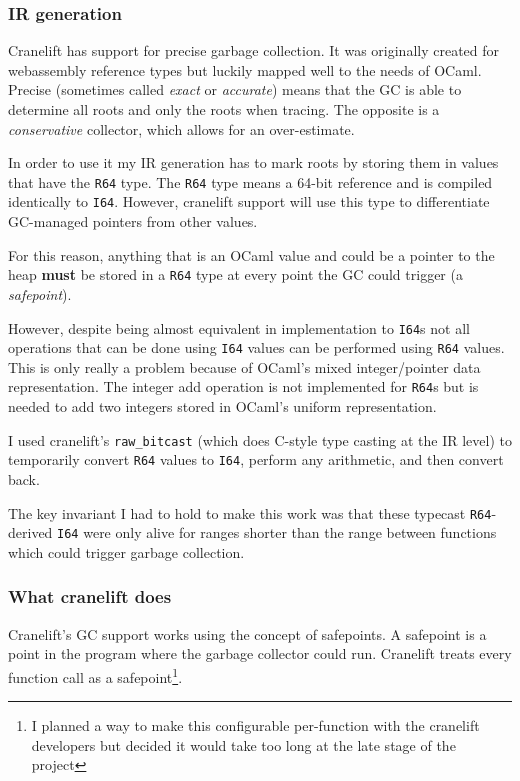 \subsubsection{IR generation} \label{gc-ir}

Cranelift has support for precise garbage collection. It was originally created for webassembly
reference types but luckily mapped well to the needs of OCaml. Precise (sometimes called
\emph{exact} or \emph{accurate}) means that the GC is able to determine all roots and only the
roots
when tracing. The opposite is a \emph{conservative} collector, which allows for an over-estimate.

In order to use it my IR generation has to mark roots by storing them in values that have the
\texttt{R64} type. The \texttt{R64} type means a 64-bit reference and is compiled identically to
\texttt{I64}. However, cranelift support will use this type to differentiate GC-managed pointers
from other values.

For this reason, anything that is an OCaml value and could be a pointer to the heap \textbf{must}
be stored in a \texttt{R64} type at every point the GC could trigger (a \emph{safepoint}).

However, despite being almost equivalent in implementation to \texttt{I64}s not all operations that
can be done using \texttt{I64} values can be performed using \texttt{R64} values. This is only
really a
problem because of OCaml's mixed integer/pointer data representation. The integer add operation is
not
implemented for \texttt{R64}s but is needed to add two integers stored in OCaml's uniform
representation.

I used cranelift's \texttt{raw\_bitcast} (which does C-style type casting at the IR level) to
temporarily convert \texttt{R64} values to \texttt{I64}, perform any arithmetic, and then convert
back.

The key invariant I had to hold to make this work was that these typecast \texttt{R64}-derived
\texttt{I64} were only alive for ranges shorter than the range between functions which could
trigger
garbage collection.

\subsubsection{What cranelift does}

Cranelift's GC support works using the concept of safepoints. A safepoint is a point in the program
where the garbage collector could run. Cranelift treats every function call as a
safepoint\footnote{I planned a way to make this configurable per-function with the cranelift
      developers but decided it would take too long at the late stage of the project}.

